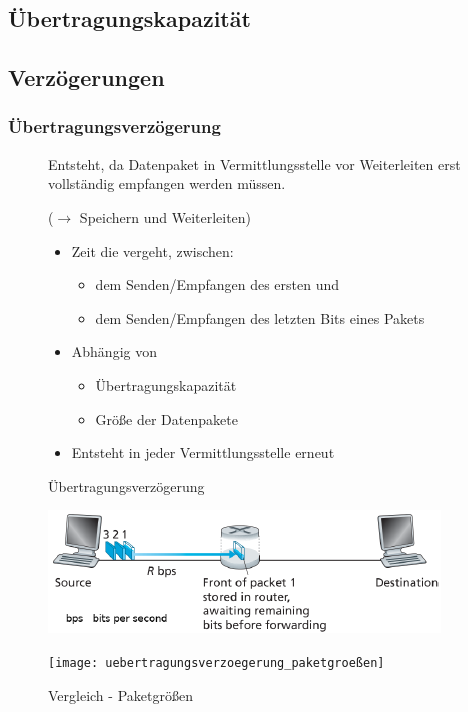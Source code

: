 \documentclass[12pt]{report}
\begin{document}
\subsection{Übertragungskapazität}
\subsection{Verzögerungen}

\subsubsection{Übertragungsverzögerung}
\begin{figure}[H]
  \begin{minipage}[t]{0.45\textwidth}
    Entsteht, da Datenpaket in Vermittlungsstelle vor Weiterleiten
    erst vollständig empfangen werden müssen. 

    ($\rightarrow$ Speichern und Weiterleiten)
    \begin{itemize}

      \item Zeit die vergeht, zwischen:
            \begin{itemize}
              \item dem Senden/Empfangen des ersten und
              \item dem Senden/Empfangen des letzten Bits eines Pakets
            \end{itemize}
      \item Abhängig von
            \begin{itemize}
              \item Übertragungskapazität
              \item Größe der Datenpakete
            \end{itemize}
      \item Entsteht in jeder Vermittlungsstelle erneut
    \end{itemize}
  \end{minipage}
  \hfill
  \begin{minipage}[t]{0.45\textwidth}
    \caption{Übertragungsverzögerung}
    \begin{center}
      \includegraphics[width=\textwidth]{uebertragungsverzoegerung}
    \end{center}

    \caption{Vergleich - Paketgrößen}
    \begin{center}
      \texttt{[image: uebertragungsverzoegerung\_paketgroeßen]}
    \end{center}
  \end{minipage}
\end{figure}
\end{document}
